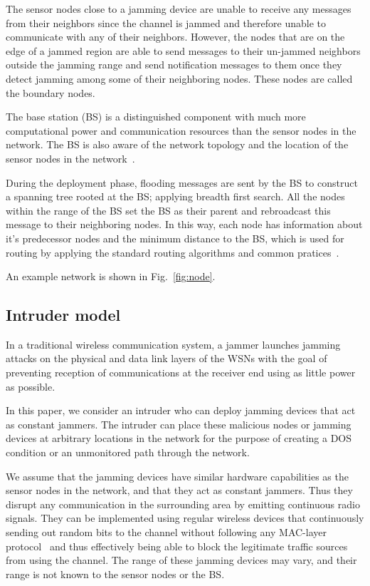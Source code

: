 \documentclass[conference]{IEEEtran}
\begin{document}
The sensor nodes close to a jamming device are unable to receive any messages from their neighbors since the channel is jammed  and therefore unable to communicate with any of their neighbors. However, the nodes that are on the edge of a jammed region are able to send messages to their un-jammed neighbors outside the jamming range and send notification messages to them once they detect jamming among some of their neighboring nodes. These nodes are called the boundary nodes.

The base station (BS) is a distinguished component with much more computational power and communication resources than the sensor nodes in the network. The BS is also aware of the network topology and the location of the sensor nodes in the network~\cite{location1, location2}. 

During the deployment phase, flooding messages are sent by the BS to construct a spanning tree rooted at the BS; applying breadth first search. All the nodes within the range of the BS set the BS as their parent and rebroadcast this message to their neighboring nodes. In this way, each node has information about it's predecessor nodes and the minimum distance to the BS, which is used for routing by applying the standard routing algorithms and common pratices~\cite{route1, Schurgers01energyefficient}.

An example network is shown in Fig.~\ref{fig:node}.

\subsection{Intruder model}
In a traditional wireless communication system, a jammer launches jamming attacks on the physical and data link layers of the WSNs with the goal of preventing reception of communications at the receiver end using as little power as possible.

In this paper, we consider an intruder who can deploy jamming devices that act as constant jammers. The intruder can place these malicious nodes or jamming devices at arbitrary locations in the network for the purpose of creating a DOS condition or an unmonitored path through the network. 

We assume that the jamming devices have similar hardware capabilities as the sensor nodes in the network, and that they act as constant jammers. Thus they disrupt any communication in the surrounding area by emitting continuous radio signals. They can be implemented using regular wireless devices that continuously sending out random bits to the channel without following any MAC-layer protocol~\cite{FEASJAM} and thus effectively being able to block the legitimate traffic sources from using the channel. The range of these jamming devices may vary, and their range is not known to the sensor nodes or the BS. 
\end{document}
